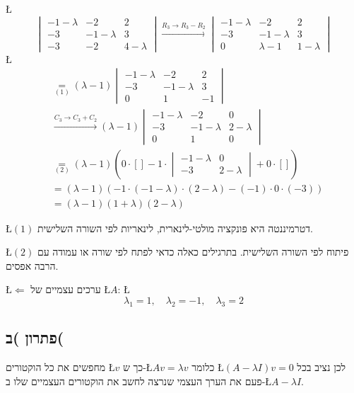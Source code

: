 \documentclass[english,hebrew]{article}
\begin{document}
\L{%
\[
\begin{vmatrix}-1-\lambda & -2 & 2\\
-3 & -1-\lambda & 3\\
-3 & -2 & 4-\lambda
\end{vmatrix}\xrightarrow{R_{3}\to R_{3}-R_{2}}\begin{vmatrix}-1-\lambda & -2 & 2\\
-3 & -1-\lambda & 3\\
0 & \lambda-1 & 1-\lambda
\end{vmatrix}
\]
}%
\L{%
\begin{align*}
 & \underset{(1)}{=}\left(\lambda-1\right)\begin{vmatrix}-1-\lambda & -2 & 2\\
-3 & -1-\lambda & 3\\
0 & 1 & -1
\end{vmatrix}\\
 & \xrightarrow{C_{3}\to C_{3}+C_{2}}\left(\lambda-1\right)\begin{vmatrix}-1-\lambda & -2 & 0\\
-3 & -1-\lambda & 2-\lambda\\
0 & 1 & 0
\end{vmatrix}\\
 & \underset{(2)}{=}\left(\lambda-1\right)\left(0\cdot[]-1\cdot\begin{vmatrix}-1-\lambda & 0\\
-3 & 2-\lambda
\end{vmatrix}+0\cdot[]\right)\\
 & =\left(\lambda-1\right)\left(-1\cdot\left(-1-\lambda\right)\cdot\left(2-\lambda\right)-\left(-1\right)\cdot0\cdot\left(-3\right)\right)\\
 & =\left(\lambda-1\right)\left(1+\lambda\right)\left(2-\lambda\right)
\end{align*}
}%

\L{$(1)$} דטרמיננטה היא פונקציה מולטי-לינארית, לינאריות לפי השורה
השלישית.

\L{$(2)$} פיתוח לפי השורה השלישית. בתרגילים כאלה כדאי לפתח לפי שורה
או עמודה עם הרבה אפסים.

\L{$\Leftarrow$} ערכים עצמיים של \L{$A$}: \L{%
\[
\lambda_{1}=1,\quad\lambda_{2}=-1,\quad\lambda_{3}=2
\]
}%

\subsection{פתרון )ב(}

מחפשים את כל הוקטורים \L{$v$} כך ש-\L{$Av=\lambda v$} כלומר \L{$\left(A-\lambda I\right)v=0$}
לכן נציב בכל פעם את הערך העצמי שנרצה לחשב את הוקטורים העצמיים שלו
ב-\L{$A-\lambda I$}.
\end{document}
